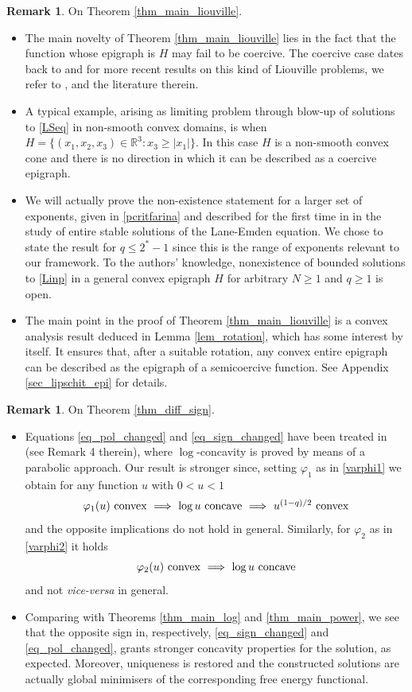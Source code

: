 \documentclass[12pt]{amsart}
\numberwithin{equation}{section}
\theoremstyle{plain}
\theoremstyle{plain}
\theoremstyle{plain}
\theoremstyle{definition}
\newtheorem{remark}[theorem]{Remark}
\newcommand{\R}{{\mathbb R}}
\renewcommand{\le}{\leqslant}
\renewcommand{\ge}{\geqslant}
\begin{document}
 \begin{remark}
On Theorem \ref{thm_main_liouville}.
\begin{itemize}[leftmargin=*]
\item
The main novelty of Theorem \ref{thm_main_liouville} lies in the fact that the function whose epigraph is $H$ may fail to be coercive. 
The coercive case dates back to \cite{EsLi82} and for more recent results on this kind of Liouville problems, we refer to \cite[Part I]{QuSo19}, \cite{DFP23} and the literature therein. 
\item
A typical example, arising as limiting problem through blow-up of solutions to \eqref{LSeq} in non-smooth convex domains, is when $H=\{(x_1, x_2, x_3)\in \R^3: x_3\ge |x_1|\}$. 
In this case $H$ is a non-smooth convex cone and there is no direction in which it can be described as a coercive epigraph. 
\item
We will actually prove the non-existence statement for a larger set of exponents, given in \eqref{pcritfarina} and described for the first time in \cite{Far07} in the study of entire stable solutions of the Lane-Emden equation. 
We chose to state the result for $q\le 2^*-1$ since this is the range of exponents relevant to our framework. 
To the authors' knowledge, nonexistence of bounded solutions to \eqref{Linp} in a general convex epigraph $H$ for arbitrary $N\ge 1$ and $q\ge 1$ is open.
\item
The main point in the proof of Theorem \ref{thm_main_liouville} is a convex analysis result deduced in Lemma \ref{lem_rotation}, which has some interest by itself. It ensures that, after a suitable rotation, any convex entire epigraph can be described as the epigraph of a semicoercive function. 
See Appendix \ref{sec_lipschit_epi} for details.
\end{itemize}
\end{remark}

\begin{remark}
On Theorem \ref{thm_diff_sign}. 
 \label{rem_Lions1981}
 \begin{itemize}[leftmargin=*]
 \item
Equations \eqref{eq_pol_changed} and \eqref{eq_sign_changed} have been treated in \cite{Lio81} (see Remark 4 therein), where $\log$-concavity is proved by means of a parabolic approach. 
Our result is stronger since, setting $\varphi_1$ as in \eqref{varphi1} we obtain for any function $u$ with $0<u<1$
$$\hbox{$\varphi_1(u)$ convex $\implies$ $\log u$ concave $\implies$ $u^{(1-q)/2}$ convex}$$
 and the opposite implications do not hold in general.
Similarly, for $\varphi_2$ as in \eqref{varphi2} it holds
$$\hbox{$\varphi_2(u)$ convex $\implies$ $\log u$ concave}$$ 
and not {\em vice-versa} in general.
\item
Comparing with Theorems \ref{thm_main_log} and \ref{thm_main_power}, we see that the opposite sign in, respectively, \eqref{eq_sign_changed} and \eqref{eq_pol_changed}, grants stronger concavity properties for the solution, as expected. 
Moreover, uniqueness is restored and the constructed solutions are actually global minimisers of the corresponding free energy functional.
\end{itemize}
\end{remark}
\end{document}
